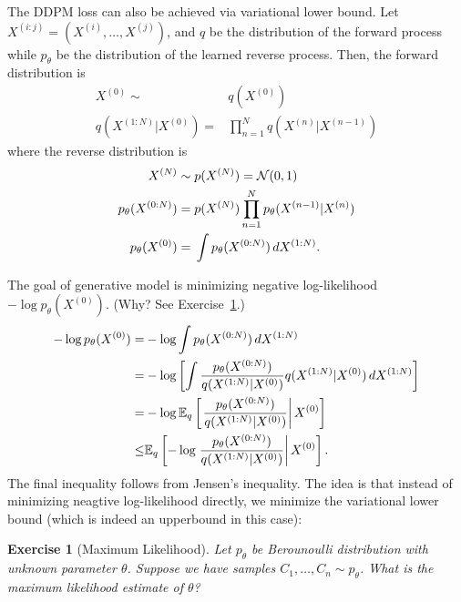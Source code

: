 \documentclass[11pt, a4paper]{article}
\newtheorem{exercise}{Exercise}
\begin{document}
The DDPM loss can also be achieved via variational lower bound.
Let $X^{(i:j)} = (X^{(i)}, \dots, X^{(j)})$, and $q$ be the distribution of the forward process while $p_{\theta}$ be the distribution of the learned reverse process.
Then, the forward distribution is 
\begin{align}
    X^{(0)} \sim& q(X^{(0)})\\
    q(X^{(1:N)}|X^{(0)}) =& \prod_{n=1}^N q(X^{(n)}|X^{(n-1)})
\end{align}
where the reverse distribution is
\begin{align}
    X^{(N)}\sim&\; p(X^{(N)})={\cal N}(0, 1)\\
    p_{\theta} (X^{(0:N)}) =&\; p(X^{(N)}) \prod_{n=1}^N p_{\theta}(X^{(n-1)}|X^{(n)})\\
    p_{\theta}(X^{(0)}) =&\; \int p_{\theta}(X^{(0:N)})\, dX^{(1:N)}.
\end{align}

The goal of generative model is minimizing negative log-likelihood \(-\log p_\theta(X^{(0)})\). (Why? See Exercise~\ref{ML}.)
\begin{align}
    -\log p_{\theta}(X^{(0)}) =& -\log \int p_{\theta}(X^{(0:N)})\, dX^{(1:N)}\\
    =& -\log \left[\int \frac{p_{\theta}(X^{(0:N)})}{q(X^{(1:N)}|X^{(0)})} q(X^{(1:N)}|X^{(0)})\, dX^{(1:N)}\right]\\
    =& -\log \mathbb{E}_q\left[\left.\frac{p_{\theta}(X^{(0:N)})}{q(X^{(1:N)}|X^{(0)})} \right|X^{(0)}\right]\\
    \leq& \mathbb{E}_q\left[-\log \left.\frac{p_{\theta}(X^{(0:N)})}{q(X^{(1:N)}|X^{(0)})} \right|X^{(0)}\right].
\end{align}
The final inequality follows from Jensen's inequality. The idea is that instead of minimizing neagtive log-likelihood directly,
we minimize the variational lower bound (which is indeed an upperbound in this case):

\begin{exercise}[Maximum Likelihood] \label{ML}
    Let $p_{\theta}$ be Berounoulli distribution with unknown parameter $\theta$.
    Suppose we have samples $C_1, \dots, C_n\sim p_{\theta}$.
    What is the maximum likelihood estimate of $\theta$?
\end{exercise}
\end{document}
